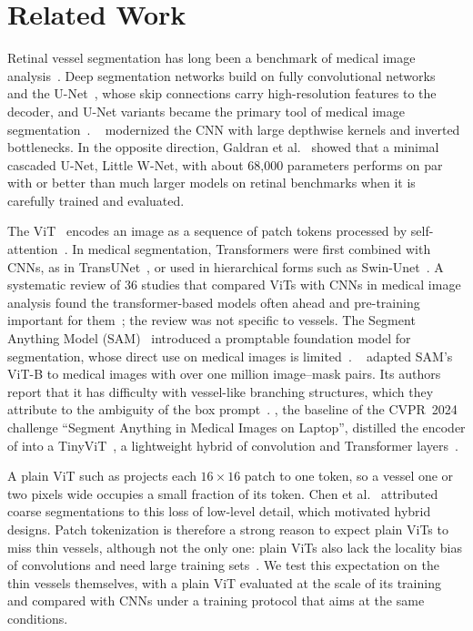 \section{Related Work}
\label{sec:related_work}

Retinal vessel segmentation has long been a benchmark of medical image analysis~\cite{Staal2004, moccia2018blood}. Deep segmentation networks build on fully convolutional networks~\cite{Long_2015_CVPR} and the U-Net~\cite{ronneberger2015u}, whose skip connections carry high-resolution features to the decoder, and U-Net variants became the primary tool of medical image segmentation~\cite{siddique2021u}. \convnext{}~\cite{liu2022convnet} modernized the CNN with large depthwise kernels and inverted bottlenecks. In the opposite direction, Galdran et al.~\cite{galdran2020littlewnetcouldstateoftheart} showed that a minimal cascaded U-Net, Little W-Net, with about 68,000 parameters performs on par with or better than much larger models on retinal benchmarks when it is carefully trained and evaluated.

The ViT~\cite{dosovitskiy2020image} encodes an image as a sequence of patch tokens processed by self-attention~\cite{vaswani2017attention}. In medical segmentation, Transformers were first combined with CNNs, as in TransUNet~\cite{chen2021transunet}, or used in hierarchical forms such as Swin-Unet~\cite{cao2022swin}. A systematic review of 36 studies that compared ViTs with CNNs in medical image analysis found the transformer-based models often ahead and pre-training important for them~\cite{takahashi2024comparison}; the review was not specific to vessels. The Segment Anything Model (SAM)~\cite{Kirillov_2023_ICCV} introduced a promptable foundation model for segmentation, whose direct use on medical images is limited~\cite{zhang2024segmentmodelmedicalimage}. \medsam{}~\cite{ma2024segment} adapted SAM's ViT-B to medical images with over one million image--mask pairs. Its authors report that it has difficulty with vessel-like branching structures, which they attribute to the ambiguity of the box prompt~\cite{ma2024segment}. \litemedsam{}, the baseline of the CVPR~2024 challenge ``Segment Anything in Medical Images on Laptop'', distilled the encoder of \medsam{} into a TinyViT~\cite{wu2022tinyvit}, a lightweight hybrid of convolution and Transformer layers~\cite{ma2024efficient}.

A plain ViT such as \medsam{} projects each $16 \times 16$ patch to one token, so a vessel one or two pixels wide occupies a small fraction of its token. Chen et al.~\cite{chen2021transunet} attributed coarse segmentations to this loss of low-level detail, which motivated hybrid designs. Patch tokenization is therefore a strong reason to expect plain ViTs to miss thin vessels, although not the only one: plain ViTs also lack the locality bias of convolutions and need large training sets~\cite{dosovitskiy2020image}. We test this expectation on the thin vessels themselves, with a plain ViT evaluated at the scale of its training and compared with CNNs under a training protocol that aims at the same conditions.
